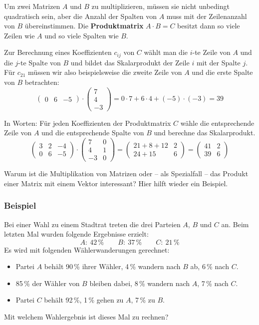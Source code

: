 Um zwei Matrizen $A$ und $B$ zu multiplizieren, müssen sie nicht unbedingt quadratisch sein, aber die Anzahl der Spalten von $A$ muss mit der Zeilenanzahl von $B$ übereinstimmen. Die \textbf{Produktmatrix} $A \cdot B = C$ besitzt dann so viele Zeilen wie $A$ und so viele Spalten wie $B$.

Zur Berechnung eines Koeffizienten $c_{ij}$ von $C$ wählt man die $i$-te Zeile von $A$ und die $j$-te Spalte von $B$ und bildet das Skalarprodukt der Zeile $i$ mit der Spalte $j$. Für $c_{21}$ müssen wir also beispielsweise die zweite Zeile von $A$ und die erste Spalte von $B$ betrachten:
\[ \begin{pmatrix} 0 & 6 & -5 \end{pmatrix} \cdot \begin{pmatrix} 7 \\ 4 \\ -3 \end{pmatrix} = 0 \cdot 7 + 6 \cdot 4 + (-5) \cdot (-3) = 39 \]

In Worten: Für jeden Koeffizienten der Produktmatrix $C$ wähle die entsprechende Zeile von $A$ und die entsprechende Spalte von $B$ und berechne das Skalarprodukt.
\[ \begin{pmatrix} 3 & 2 & -4 \\ 0 & 6 & -5 \end{pmatrix} \cdot \begin{pmatrix} 7 & 0 \\ 4 & 1 \\ -3 & 0 \end{pmatrix} = \begin{pmatrix} 21+8+12 & 2 \\ 24+15 & 6 \end{pmatrix} = \begin{pmatrix} 41 & 2 \\ 39 & 6 \end{pmatrix} \]

Warum ist die Multiplikation von Matrizen oder -- als Spezialfall -- das Produkt einer Matrix mit einem Vektor interessant? Hier hilft wieder ein Beispiel.

\subsubsection{Beispiel}

Bei einer Wahl zu einem Stadtrat treten die drei Parteien $A$, $B$ und $C$ an. Beim letzten Mal wurden folgende Ergebnisse erzielt:
\[ A: \ 42\,\% \qquad B: \ 37\,\% \qquad C: \ 21\,\% \]
Es wird mit folgenden Wählerwanderungen gerechnet:
\begin{itemize}
  \item Partei $A$ behält 90\,\% ihrer Wähler, 4\,\% wandern nach $B$ ab, 6\,\% nach $C$.
  \item 85\,\% der Wähler von $B$ bleiben dabei, 8\,\% wandern nach $A$, 7\,\% nach $C$.
  \item Partei $C$ behält 92\,\%, 1\,\% gehen zu $A$, 7\,\% zu $B$.
\end{itemize}
Mit welchem Wahlergebnis ist dieses Mal zu rechnen?

